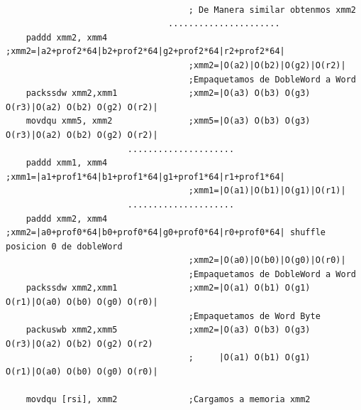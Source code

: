 \begin{codesnippet}
\begin{verbatim}
    
                                    ; De Manera similar obtenmos xmm2
                                ......................			
    paddd xmm2, xmm4                ;xmm2=|a2+prof2*64|b2+prof2*64|g2+prof2*64|r2+prof2*64|
                                    ;xmm2=|O(a2)|O(b2)|O(g2)|O(r2)|	
                                    ;Empaquetamos de DobleWord a Word	
    packssdw xmm2,xmm1              ;xmm2=|O(a3) O(b3) O(g3) O(r3)|O(a2) O(b2) O(g2) O(r2)|
    movdqu xmm5, xmm2               ;xmm5=|O(a3) O(b3) O(g3) O(r3)|O(a2) O(b2) O(g2) O(r2)|
						.....................
    paddd xmm1, xmm4                ;xmm1=|a1+prof1*64|b1+prof1*64|g1+prof1*64|r1+prof1*64|
                                    ;xmm1=|O(a1)|O(b1)|O(g1)|O(r1)|						
                        .....................
    paddd xmm2, xmm4                ;xmm2=|a0+prof0*64|b0+prof0*64|g0+prof0*64|r0+prof0*64| shuffle posicion 0 de dobleWord
                                    ;xmm2=|O(a0)|O(b0)|O(g0)|O(r0)|                   
                                    ;Empaquetamos de DobleWord a Word
    packssdw xmm2,xmm1              ;xmm2=|O(a1) O(b1) O(g1) O(r1)|O(a0) O(b0) O(g0) O(r0)|						
                                    ;Empaquetamos de Word Byte
    packuswb xmm2,xmm5              ;xmm2=|O(a3) O(b3) O(g3) O(r3)|O(a2) O(b2) O(g2) O(r2)
                                    ;     |O(a1) O(b1) O(g1) O(r1)|O(a0) O(b0) O(g0) O(r0)|                      

    movdqu [rsi], xmm2              ;Cargamos a memoria xmm2                        			
\end{verbatim}
\end{codesnippet}

